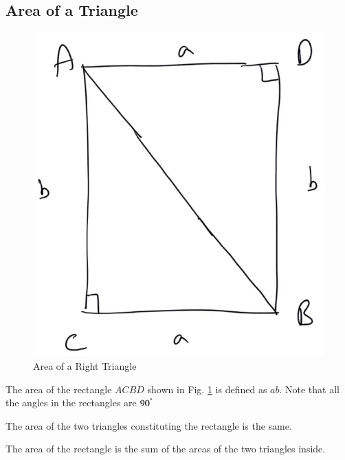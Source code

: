 \subsection{Area of a Triangle}

\begin{figure}[!h]
	\begin{center}
		
		\includegraphics[width=\columnwidth]{./figs/ch2_sq_ar}
		\vspace*{-10cm}
	\end{center}
	\caption{Area of a Right Triangle}
	\label{ch2_sq_ar}	
\end{figure}


\begin{definition}
	The area of the rectangle $ACBD$ shown in Fig. \ref{ch2_sq_ar} is defined as $ab$. Note that all the angles in the rectangles are $90^{\degree}$
	\label{ch2_sq_ar}
\end{definition}
\begin{definition}
	The area of the two triangles constituting the rectangle is the same.
	\label{ch2_triang_eq}
\end{definition}
\begin{definition}
	The area of the rectangle is the sum of the areas of the two triangles inside.
	\label{ch2_triang_sum}
\end{definition}

